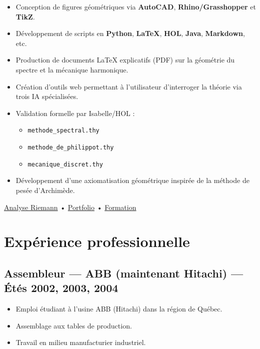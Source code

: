 \documentclass[11pt,a4paper]{article}
\begin{document}
\begin{itemize}
    \item Conception de figures géométriques via \textbf{AutoCAD}, \textbf{Rhino/Grasshopper} et \textbf{TikZ}.
    \item Développement de scripts en \textbf{Python}, \textbf{LaTeX}, \textbf{HOL}, \textbf{Java}, \textbf{Markdown}, etc.
    \item Production de documents LaTeX explicatifs (PDF) sur la géométrie du spectre et la mécanique harmonique.
    \item Création d’outils web permettant à l’utilisateur d’interroger la théorie via trois IA spécialisées.
    \item Validation formelle par Isabelle/HOL :
    \begin{itemize}
        \item \texttt{methode\_spectral.thy}
        \item \texttt{methode\_de\_philippot.thy}
        \item \texttt{mecanique\_discret.thy}
    \end{itemize}
    \item Développement d’une axiomatisation géométrique inspirée de la méthode de pesée d’Archimède.
\end{itemize}

\href{https://github.com/2racinede4carreunivers-dev/analyse-de-la-conjecture-zeta-riemann-savard.git}{Analyse Riemann} •
\href{https://github.com/2racinede4carreunivers-dev/porte_folio_savard.git}{Portfolio} •
\href{https://github.com/2racinede4carreunivers-dev/formation_evolutive_savard.git}{Formation}

\section*{Expérience professionnelle}

\subsection*{Assembleur — ABB (maintenant Hitachi) — Étés 2002, 2003, 2004}
\begin{itemize}
    \item Emploi étudiant à l'usine ABB (Hitachi) dans la région de Québec.
    \item Assemblage aux tables de production.
    \item Travail en milieu manufacturier industriel.
\end{itemize}
\end{document}
